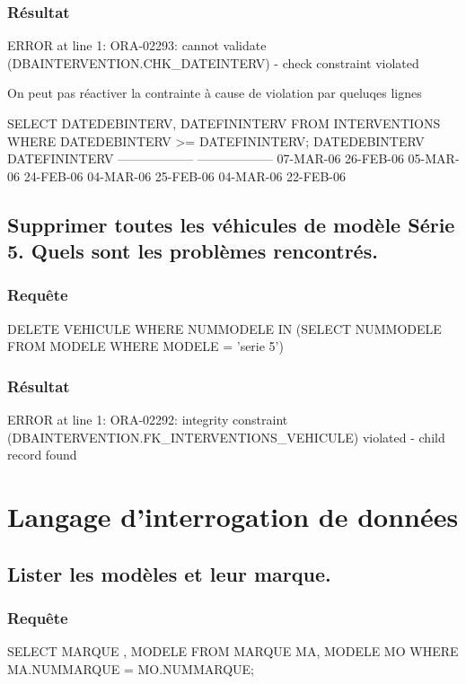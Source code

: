 \documentclass[•]{article}
\begin{document}
\begin{enumerate}
    \subsubsection{Résultat}
    \begin{sql}
    ERROR at line 1:
    ORA-02293: cannot validate (DBAINTERVENTION.CHK_DATEINTERV) - check constraint violated     
\end{sql}
On peut pas réactiver la contrainte à cause de violation par queluqes lignes
\begin{sql}
SELECT DATEDEBINTERV, DATEFININTERV FROM INTERVENTIONS WHERE DATEDEBINTERV >= DATEFININTERV;
DATEDEBINTERV      DATEFININTERV
------------------ ------------------
07-MAR-06          26-FEB-06
05-MAR-06          24-FEB-06
04-MAR-06          25-FEB-06
04-MAR-06          22-FEB-06
\end{sql}
\end{enumerate}

\subsection{Supprimer toutes les véhicules de modèle Série 5. Quels sont les problèmes rencontrés.}
\subsubsection{Requête}
\begin{sql}
DELETE VEHICULE WHERE NUMMODELE IN (SELECT NUMMODELE FROM MODELE WHERE MODELE = 'serie 5')
\end{sql}
\subsubsection{Résultat}
\begin{sql}
ERROR at line 1:
ORA-02292: integrity constraint (DBAINTERVENTION.FK_INTERVENTIONS_VEHICULE) violated -
child record found 
\end{sql}
\section{Langage d’interrogation de données}
\subsection{Lister les modèles et leur marque.}
\subsubsection{Requête}
\begin{sql}
SELECT MARQUE , MODELE FROM MARQUE MA, MODELE MO WHERE MA.NUMMARQUE = MO.NUMMARQUE;\end{sql}
\end{document}
